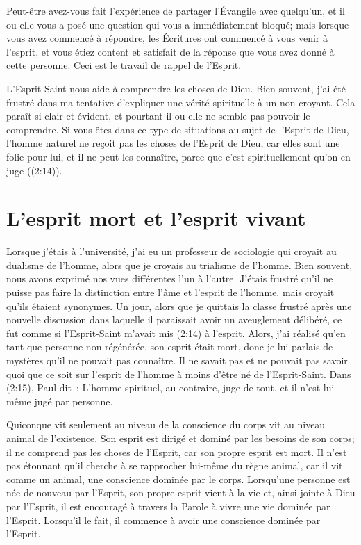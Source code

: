 Peut-être avez-vous fait l'expérience de partager l'Évangile avec quelqu'un,
 et il ou elle vous a posé une question qui vous a immédiatement bloqué;
 mais lorsque vous avez commencé à répondre, les Écritures ont commencé
 à vous venir à l'esprit, et vous étiez content et satisfait de la réponse
 que vous avez donné à cette personne. Ceci est le travail de rappel de l'Esprit.

L'Esprit-Saint nous aide à comprendre les choses de Dieu.
 Bien souvent, j'ai été frustré dans ma tentative d'expliquer
 une vérité spirituelle à un non croyant.
 Cela paraît si clair et évident, et pourtant il ou elle ne semble pas
 pouvoir le comprendre.
 Si vous êtes dans ce type de situations au sujet de l'Esprit de Dieu,
 l'homme naturel \og ne reçoit pas les choses de l'Esprit de Dieu,
 car elles sont une folie pour lui, et il ne peut les connaître, 
 parce que c'est spirituellement qu'on en juge \fg{}
 ((2:14)).


\section*{L'esprit mort et l'esprit vivant}

\begin{specialpar}{}
Lorsque j'étais à l'université, j'ai eu un professeur de sociologie
 qui croyait au dualisme de l'homme, alors que je croyais au trialisme de l'homme.
 Bien souvent, nous avons exprimé nos vues différentes l'un à l'autre.
 J'étais frustré qu'il ne puisse pas faire la distinction entre l'âme
 et l'esprit de l'homme, mais croyait qu'ils étaient synonymes.
 Un jour, alors que je quittais la classe frustré
 après une nouvelle discussion dans laquelle il paraissait
 avoir un aveuglement délibéré, ce fut comme si l'Esprit-Saint
 m'avait mis (2:14) à l'esprit.
 Alors, j'ai réalisé qu'en tant que \linebreak
 personne non régénérée,
 son esprit était mort, donc je lui parlais de mystères qu'il ne
 pouvait pas connaître.
 Il ne savait pas et ne
 pouvait pas savoir quoi que ce soit sur l'esprit
 de l'homme à moins d'être né de l'Esprit-Saint.
 Dans (2:15), Paul dit~:
 \og L'homme spirituel, au contraire, juge de tout,
 et il n'est lui-même jugé par personne. \fg{}
\end{specialpar}

Quiconque vit seulement au niveau de la conscience du corps
 vit au niveau animal de l'existence.
 Son esprit est dirigé et dominé par les besoins de son corps;
 il ne comprend pas les choses de l'Esprit, car son propre esprit est mort.
 Il n'est pas étonnant qu'il cherche à se rapprocher lui-même
 du règne animal, car il vit comme un animal,
 une conscience dominée par le corps.
 Lorsqu'une personne est née de nouveau par l'Esprit,
 son propre esprit vient à la vie et, ainsi jointe à Dieu par l'Esprit,
 il est encouragé à travers la Parole à vivre une vie dominée par l'Esprit.
 Lorsqu'il le fait, il commence à avoir une conscience dominée par l'Esprit.


